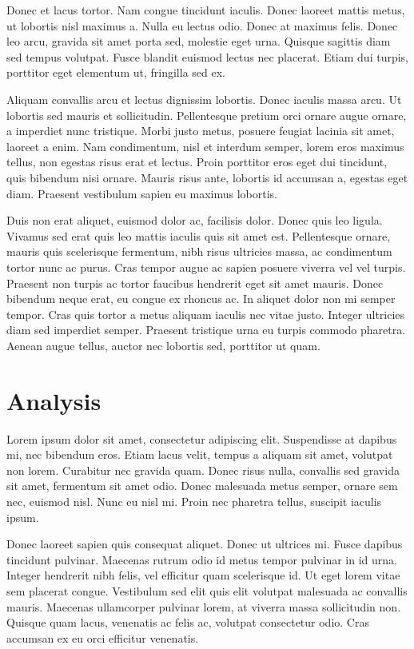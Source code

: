 Donec et lacus tortor. Nam congue tincidunt iaculis. Donec laoreet mattis metus, ut lobortis nisl maximus a. Nulla eu lectus odio. Donec at maximus felis. Donec leo arcu, gravida sit amet porta sed, molestie eget urna. Quisque sagittis diam sed tempus volutpat. Fusce blandit euismod lectus nec placerat. Etiam dui turpis, porttitor eget elementum ut, fringilla sed ex.

Aliquam convallis arcu et lectus dignissim lobortis. Donec iaculis massa arcu. Ut lobortis sed mauris et sollicitudin. Pellentesque pretium orci ornare augue ornare, a imperdiet nunc tristique. Morbi justo metus, posuere feugiat lacinia sit amet, laoreet a enim. Nam condimentum, nisl et interdum semper, lorem eros maximus tellus, non egestas risus erat et lectus. Proin porttitor eros eget dui tincidunt, quis bibendum nisi ornare. Mauris risus ante, lobortis id accumsan a, egestas eget diam. Praesent vestibulum sapien eu maximus lobortis.

Duis non erat aliquet, euismod dolor ac, facilisis dolor. Donec quis leo ligula. Vivamus sed erat quis leo mattis iaculis quis sit amet est. Pellentesque ornare, mauris quis scelerisque fermentum, nibh risus ultricies massa, ac condimentum tortor nunc ac purus. Cras tempor augue ac sapien posuere viverra vel vel turpis. Praesent non turpis ac tortor faucibus hendrerit eget sit amet mauris. Donec bibendum neque erat, eu congue ex rhoncus ac. In aliquet dolor non mi semper tempor. Cras quis tortor a metus aliquam iaculis nec vitae justo. Integer ultricies diam sed imperdiet semper. Praesent tristique urna eu turpis commodo pharetra. Aenean augue tellus, auctor nec lobortis sed, porttitor ut quam.

\section{Analysis}
Lorem ipsum dolor sit amet, consectetur adipiscing elit. Suspendisse at dapibus mi, nec bibendum eros. Etiam lacus velit, tempus a aliquam sit amet, volutpat non lorem. Curabitur nec gravida quam. Donec risus nulla, convallis sed gravida sit amet, fermentum sit amet odio. Donec malesuada metus semper, ornare sem nec, euismod nisl. Nunc eu nisl mi. Proin nec pharetra tellus, suscipit iaculis ipsum.

Donec laoreet sapien quis consequat aliquet. Donec ut ultrices mi. Fusce dapibus tincidunt pulvinar. Maecenas rutrum odio id metus tempor pulvinar in id urna. Integer hendrerit nibh felis, vel efficitur quam scelerisque id. Ut eget lorem vitae sem placerat congue. Vestibulum sed elit quis elit volutpat malesuada ac convallis mauris. Maecenas ullamcorper pulvinar lorem, at viverra massa sollicitudin non. Quisque quam lacus, venenatis ac felis ac, volutpat consectetur odio. Cras accumsan ex eu orci efficitur venenatis.

